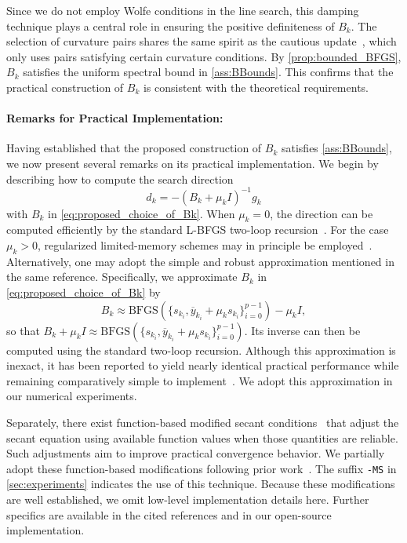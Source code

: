 \documentclass[journal]{subfiles}
\begin{document}
Since we do not employ Wolfe conditions in the line search, this damping technique plays a central role in ensuring the positive definiteness of $B_k$.
The selection of curvature pairs shares the same spirit as the cautious update~\citep{liGlobalConvergenceBFGS2001,mannelStructuredLBFGSMethod2024,mannelGlobalizationLBFGSBarzilai2025}, which only uses pairs satisfying certain curvature conditions.
By \cref{prop:bounded_BFGS}, $B_k$ satisfies the uniform spectral bound in \cref{ass:BBounds}.
This confirms that the practical construction of $B_k$ is consistent with the theoretical requirements.

\paragraph{Remarks for Practical Implementation: }

Having established that the proposed construction of $B_k$ satisfies \cref{ass:BBounds}, we now present several remarks on its practical implementation.
We begin by describing how to compute the search direction
\begin{equation*}
    d_k=-(B_k+\mu_k I)^{-1}g_k
\end{equation*}
with $B_k$ in \cref{eq:proposed_choice_of_Bk}.
When $\mu_k=0$, the direction can be computed efficiently by the standard L-BFGS two-loop recursion~\citep{liuLimitedMemoryBFGS1989a,nocedal1999numerical}.
For the case $\mu_k>0$, regularized limited-memory schemes may in principle be employed~\citep{kanzowRegularizationLimitedMemory2023}.
Alternatively, one may adopt the simple and robust approximation mentioned in the same reference.
Specifically, we approximate $B_k$ in \cref{eq:proposed_choice_of_Bk} by
\begin{equation}\label{eq:approx_computation_of_regularized_quasi_Newton}
    B_k\approx\mathrm{BFGS}(\{s_{k_i},\overline{y}_{k_i}+\mu_k s_{k_i}\}_{i=0}^{p-1})-\mu_k I,
\end{equation}
so that $B_k+\mu_k I\approx\mathrm{BFGS}(\{s_{k_i},\overline{y}_{k_i}+\mu_k s_{k_i}\}_{i=0}^{p-1})$. Its inverse can then be computed using the standard two-loop recursion.
Although this approximation is inexact, it has been reported to yield nearly identical practical performance while remaining comparatively simple to implement~\citep{kanzowRegularizationLimitedMemory2023}.
We adopt this approximation in our numerical experiments.

Separately, there exist function-based modified secant conditions~\citep{zhangPropertiesNumericalPerformance2001,babaie-kafakiTwoNewConjugate2010,yabeLocalSuperlinearConvergence2007,hassanModifiedSecantEquation2023} that adjust the secant equation using available function values when those quantities are reliable. Such adjustments aim to improve practical convergence behavior.
We partially adopt these function-based modifications following prior work~\citep{zhangNewQuasiNewtonEquation1999,yuanConvergenceAnalysisModified2010}. The suffix \texttt{-MS} in \cref{sec:experiments} indicates the use of this technique.
Because these modifications are well established, we omit low-level implementation details here.
Further specifics are available in the cited references and in our open-source implementation.
\end{document}
